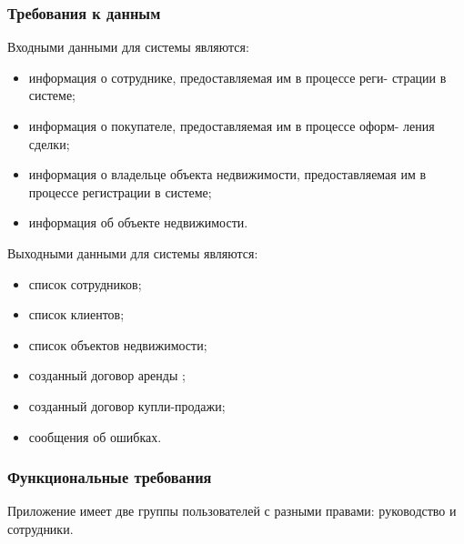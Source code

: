 \subsubsection{Требования к данным}

Входными данными для системы являются:
\begin{itemize}
\item	информация о сотруднике, предоставляемая им в процессе реги- страции в системе;

\item	информация о покупателе, предоставляемая им в процессе оформ- ления сделки;

\item	информация о владельце объекта недвижимости, предоставляемая им в процессе регистрации в системе;

\item	информация об объекте недвижимости.
\end{itemize}
Выходными данными для системы являются:
\begin{itemize}
\item	список сотрудников;

\item	список клиентов;

\item	список объектов недвижимости;

\item	созданный договор аренды ;

\item	созданный договор купли-продажи;

\item	сообщения об ошибках.
\end{itemize}

\subsubsection{Функциональные требования}

Приложение имеет две группы пользователей с разными правами: руководство и сотрудники.

